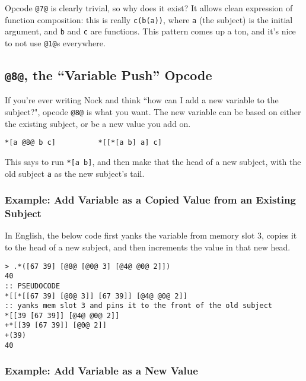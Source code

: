 \documentclass[twoside]{article}
\begin{document}
Opcode \lstinline[style=inlinecode]{@7@} is clearly trivial, so why does it exist? It allows clean expression of function composition: this is really \lstinline[style=inlinecode]{c(b(a))}, where \lstinline[style=inlinecode]{a} (the subject) is the initial argument, and \lstinline[style=inlinecode]{b} and \lstinline[style=inlinecode]{c} are functions. This pattern comes up a ton, and it's nice to not use \lstinline[style=inlinecode]{@1@}s everywhere.

\subsection{\lstinline[style=inlinecode]{@8@}, the “Variable Push” Opcode}

If you're ever writing Nock and think ``how can I add a new variable to the subject?", opcode \lstinline[style=inlinecode]{@8@} is what you want. The new variable can be based on either the existing subject, or be a new value you add on.

\begin{lstlisting}[style=listingcode]
*[a @8@ b c]          *[[*[a b] a] c]
\end{lstlisting}

This says to run \lstinline[style=inlinecode]{*[a b]}, and then make that the head of a new subject, with the old subject \lstinline[style=inlinecode]{a} as the new subject's tail.

\subsubsection{Example: Add Variable as a Copied Value from an Existing Subject}

In English, the below code first yanks the variable from memory slot 3, copies it to the head of a new subject, and then increments the value in that new head.

\begin{lstlisting}[style=listingcode]
> .*([67 39] [@8@ [@0@ 3] [@4@ @0@ 2]])
40
:: PSEUDOCODE
*[[*[[67 39] [@0@ 3]] [67 39]] [@4@ @0@ 2]]
:: yanks mem slot 3 and pins it to the front of the old subject
*[[39 [67 39]] [@4@ @0@ 2]]
+*[[39 [67 39]] [@0@ 2]]
+(39)
40
\end{lstlisting}

\subsubsection{Example: Add Variable as a New Value}
\end{document}
